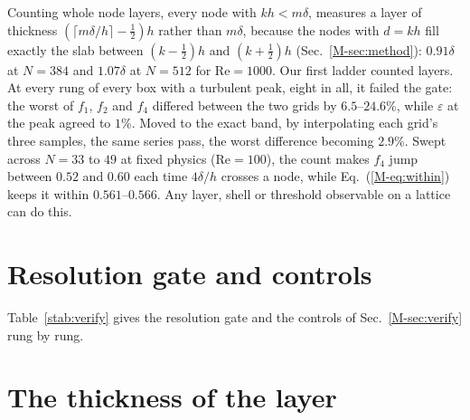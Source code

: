 \documentclass[aip,pop,reprint,amsmath,amssymb,superscriptaddress,floatfix]{revtex4-2}
\newcommand{\Rey}{\mathrm{Re}}
\newcommand{\eps}{\varepsilon}
\begin{document}
Counting whole node layers, every node with $kh<m\delta$, measures a layer of
thickness $(\lceil m\delta/h\rceil-\tfrac12)h$ rather than $m\delta$, because the
nodes with $d=kh$ fill exactly the slab between $(k-\tfrac12)h$ and $(k+\tfrac12)h$
(Sec.~\ref{M-sec:method}): $0.91\delta$ at $N=384$ and $1.07\delta$ at $N=512$ for
$\Rey=1000$. Our first ladder counted layers. At every rung of every box with a
turbulent peak, eight in all, it failed the gate: the worst of $f_1$, $f_2$ and $f_4$
differed between the two grids by $6.5$--$24.6$\%, while $\eps$ at the peak agreed to
$1$\%. Moved to the exact band, by interpolating each grid's three samples, the same
series pass, the worst difference becoming $2.9$\%. Swept across $N=33$ to $49$ at fixed physics ($\Rey=100$), the count makes
$f_4$ jump between $0.52$ and $0.60$ each time $4\delta/h$ crosses a node, while
Eq.~(\ref{M-eq:within}) keeps it within $0.561$--$0.566$. Any layer, shell or
threshold observable on a lattice can do this.

\section{Resolution gate and controls}
\label{s:gate}

Table~\ref{stab:verify} gives the resolution gate and the controls of
Sec.~\ref{M-sec:verify} rung by rung.

\begin{table}
\caption{\label{stab:verify}Resolution gate and controls. Relative differences of
$f_1$, $f_2$ and $f_4$ at the turbulent peak between the two grids of each rung, the
band of B$-$A (the two grid differences of $f_1$, added), and the shift of B$-$A in
the control run: Mach, $u_0$ halved; FP64, double precision at $N=512$.}
\begin{ruledtabular}

\end{ruledtabular}
\end{table}

\section{The thickness of the layer}
\label{s:layers}
\end{document}
